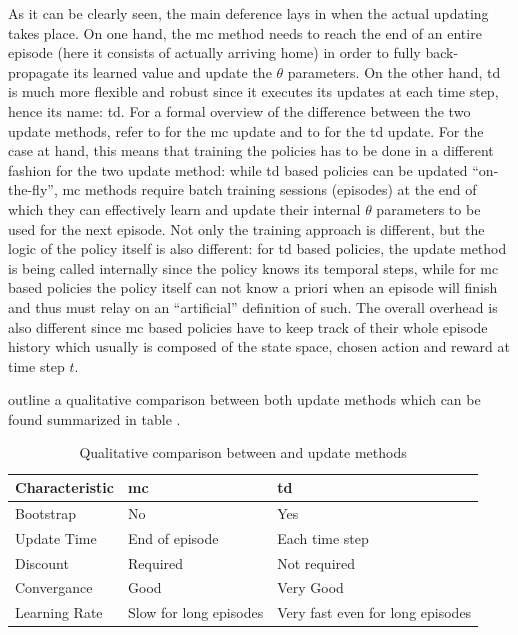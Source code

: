 \documentclass[draft=false]{seal_thesis}
\begin{document}
As it can be clearly seen, the main deference lays in when the actual updating takes place. On one hand, the \gls{mc} method needs to reach the end of an entire episode (\ie here it consists of actually arriving home) in order to fully back-propagate its learned value and update the $\theta$ parameters. On the other hand, \gls{td} is much more flexible and robust since it executes its updates at each time step, hence its name: \gls{td}.
For a formal overview of the difference between the two update methods, refer to  for the \gls{mc} update and to  for the \gls{td} update.
For the case at hand, this means that training the policies has to be done in a different fashion for the two update method: while \gls{td} based policies can be updated ``on-the-fly'', \gls{mc} methods require batch training sessions (\ie episodes) at the end of which they can effectively learn and update their internal $\theta$ parameters to be used for the next episode. Not only the training approach is different, but the logic of the policy itself is also different: for \gls{td} based policies, the update method is being called internally since the policy knows its temporal steps, while for \gls{mc} based policies the policy itself can not know a priori when an episode will finish and thus must relay on an ``artificial'' definition of such. The overall overhead is also different since \gls{mc} based policies have to keep track of their whole episode history which usually is composed of the state space, chosen action and reward at time step $t$.

\citet{Sutton2017} outline a qualitative comparison between both update methods which can be found summarized in table .

\begin{table}[!ht]
\centering
\begin{tabular}{@{}lll@{}}
\toprule
Characteristic & \gls{mc}                     & \gls{td}                               \\ \midrule
Bootstrap      & No                     & Yes                              \\
Update Time    & End of episode         & Each time step                   \\
Discount       & Required               & Not required                     \\
Convergance    & Good                   & Very Good                        \\
Learning Rate  & Slow for long episodes & Very fast even for long episodes \\ \bottomrule
\end{tabular}
\caption{Qualitative comparison between  and  update methods \citep[p. 130]{Sutton2017}}
\label{tab:mc_td_comp}
\end{table}
\end{document}
